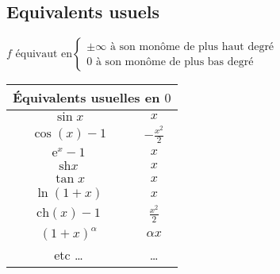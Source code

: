 \documentclass{article}
\newcommand{\ex}{\mathrm{e}}
\newcommand{\ch}{\mathrm{ch}}
\newcommand{\sh}{\mathrm{sh}}
\theoremstyle{definition}
\theoremstyle{remark}
\theoremstyle{plain}
\begin{document}
\subsection{Equivalents usuels}
$f \text{ équivaut en}
\begin{cases}
\pm \infty \text{ à son monôme de plus haut degré} \\
0 \text{ à son monôme de plus bas degré}
\end{cases}
$

\begin{tabular}{|c|c|}
\hline
\multicolumn{2}{|c|}{\'Equivalents usuelles en $0$} \\
\hline
$\sin x$ & $x$ \\
\hline
$\cos(x) - 1$ & $-\frac{x^2}{2}$ \\
\hline
$\ex^x - 1$ & $x$ \\
\hline
$\sh x $ & $x$ \\
\hline
$\tan x $ & $x$ \\
\hline
$\ln(1 + x)$ & $x$ \\
\hline
$\ch(x) - 1$ & $\frac{x^2}{2}$ \\
\hline
$(1 + x)^\alpha$ & $\alpha x$ \\
\hline
etc \ldots & \ldots \\
\hline
\end{tabular}
\end{document}
